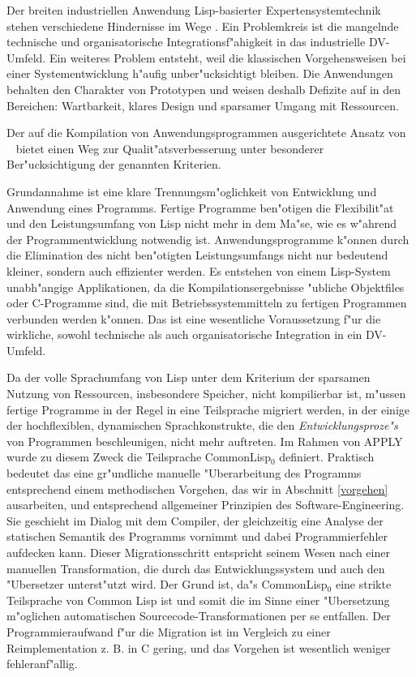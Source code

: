 Der breiten industriellen Anwendung Lisp-basierter
Expertensystemtechnik stehen verschiedene Hindernisse im Wege
\cite{Knemeyer93} \cite{Weule93} \cite{Mertens93}.  Ein Problemkreis
ist die mangelnde technische und organisatorische
Integrationsf"ahigkeit in das industrielle DV-Umfeld.  Ein weiteres
Problem entsteht, weil die klassischen Vorgehensweisen bei einer
Systementwicklung h"aufig unber"ucksichtigt bleiben. Die Anwendungen
behalten den Charakter von Prototypen und weisen deshalb Defizite auf
in den Bereichen: Wartbarkeit, klares Design und sparsamer Umgang mit
Ressourcen.

Der auf die Kompilation von Anwendungsprogrammen ausgerichtete Ansatz
von \APPLY\ \cite{APPLY/IfKI/I.1/1} \cite{gosi91}
bietet einen Weg zur Qualit"atsverbesserung unter besonderer
Ber"ucksichtigung der genannten Kriterien.

Grundannahme ist eine klare Trennungsm"oglichkeit von Entwicklung und
Anwendung eines Programms. Fertige Programme ben"otigen die
Flexibilit"at und den Leistungsumfang von Lisp nicht mehr in dem
Ma"se, wie es w"ahrend der Programmentwicklung notwendig ist.
Anwendungsprogramme k"onnen durch die Elimination des nicht
ben"otigten Leistungsumfangs nicht nur bedeutend kleiner, sondern auch
effizienter werden. Es entstehen von einem Lisp-System unabh"angige
Applikationen, da die Kompilationsergebnisse "ubliche Objektfiles oder
C-Programme sind, die mit Betriebssystemmitteln zu fertigen Programmen
verbunden werden k"onnen. Das ist eine wesentliche Voraussetzung f"ur
die wirkliche, sowohl technische als auch organisatorische Integration
in ein DV-Umfeld.

Da der volle Sprachumfang von Lisp unter dem Kriterium der sparsamen
Nutzung von Ressourcen, insbesondere Speicher, nicht kompilierbar ist,
m"ussen fertige Programme in der Regel in eine Teilsprache migriert
werden, in der einige der hochflexiblen, dynamischen Sprachkonstrukte,
die den {\em Entwicklungsproze"s} von Programmen beschleunigen, nicht
mehr auftreten. Im Rahmen von APPLY wurde zu diesem Zweck die
Teilsprache CommonLisp$_0$ \cite{APPLY/CAU/II.2/1}
definiert. Praktisch bedeutet das eine gr"undliche manuelle
"Uberarbeitung des Programms entsprechend einem methodischen Vorgehen,
das wir in Abschnitt \ref{vorgehen} ausarbeiten, und entsprechend
allgemeiner Prinzipien des Software-Engineering. Sie geschieht im
Dialog mit dem Compiler, der gleichzeitig eine Analyse der statischen
Semantik des Programms vornimmt und dabei Programmierfehler aufdecken
kann. Dieser Migrationsschritt entspricht seinem Wesen nach einer
manuellen Transformation, die durch das Entwicklungssystem und auch
den "Ubersetzer unterst"utzt wird. Der Grund ist, da"s CommonLisp$_0$
eine strikte Teilsprache von Common Lisp ist und somit die im Sinne
einer "Ubersetzung m"oglichen automatischen
Sourcecode-Transformationen per se entfallen. Der Programmieraufwand
f"ur die Migration ist im Vergleich zu einer Reimplementation z. B. in
C gering, und das Vorgehen ist wesentlich weniger fehleranf"allig.


